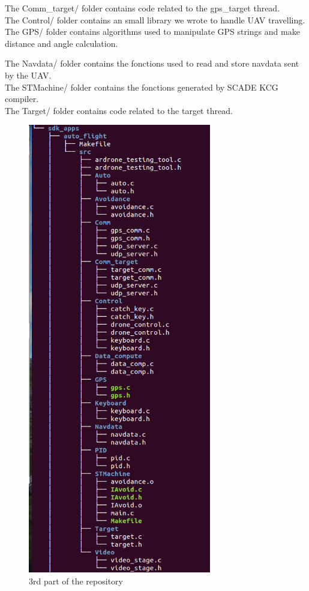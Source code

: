 The Comm\_target/ folder contains code related to the gps\_target thread.\\

The Control/ folder contains an small library we wrote to handle UAV travelling.\\

The GPS/ folder contains algorithms used to manipulate GPS strings and make distance and angle calculation.

The Navdata/ folder contains the fonctions used to read and store navdata sent by the UAV.\\

The STMachine/ folder contains the fonctions generated by SCADE KCG compiler.\\

The Target/ folder contains code related to the target thread.\\

\begin{figure}[!h] 
\begin{center}
\includegraphics[width=8cm]{imgs/c3.png}
\caption{3rd part of the repository} 
\label{img1} 
\end{center}
\end{figure} 

